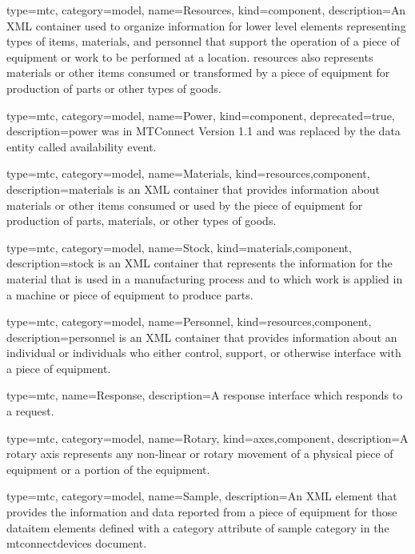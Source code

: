 {
  type=mtc,
  category=model,
  name={Resources},
  kind={component},
  description={An XML container used to organize information for \gls{lower level} elements representing types of items, materials, and personnel that support the operation of a piece of equipment or work to be performed at a location. \gls{resources} also represents materials or other items consumed or transformed by a piece of equipment for production of parts or other types of goods.}
}


{
  type=mtc,
  category=model,
  name={Power},
  kind={component},
  deprecated={true},
  description={\gls{power} was \DEPRECATED in MTConnect Version 1.1 and was replaced by the \gls{data entity} called \gls{availability event}.}
}


{
  type=mtc,
  category=model,
  name={Materials},
  kind={resources,component},
  description={\gls{materials} is an XML container that provides information about materials or other items consumed or used by the piece of equipment for production of parts, materials, or other types of goods.}
}


{
  type=mtc,
  category=model,
  name={Stock},
  kind={materials,component},
  description={\gls{stock} is an XML container that represents the information for the material that is used in a manufacturing process and to which work is applied in a machine or piece of equipment to produce parts.}
}


{
  type=mtc,
  category=model,
  name={Personnel},
  kind={resources,component},
  description={\gls{personnel} is an XML container that provides information about an individual or individuals who either control, support, or otherwise interface with a piece of equipment.
}
}


{
  type=mtc,
  name={Response},
  description={A response \gls{interface} which responds to a \gls{request}.}
}


{
  type=mtc,
  category=model,
  name={Rotary},
  kind={axes,component},
  description={A \gls{rotary} axis represents any non-linear or rotary movement of a physical piece of equipment or a portion of the equipment. }
}


{
  type=mtc,
  category=model,
  name={Sample},
  description={An XML element that provides the information and data reported from a piece of equipment for those \gls{dataitem} elements defined with a \gls{category} attribute of \gls{sample category} in the \glspl{mtconnectdevice} document. }
}


